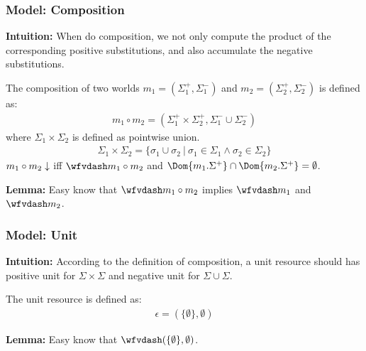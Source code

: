 \begin{frame}[fragile]
    \frametitle{Model: Composition}

\textbf{Intuition:} When do composition, we not only compute the product of the corresponding positive substitutions, and also accumulate the negative substitutions.

\begin{definition}[Composition]
    The composition of two worlds $m_1 = (\Sigma_1^+, \Sigma_1^-)$ and $m_2 = (\Sigma_2^+, \Sigma_2^-)$ is defined as:
    \begin{align*}
    m_1 \circ m_2 = (\Sigma_1^+ \times \Sigma_2^+, \Sigma_1^- \cup \Sigma_2^-)
    \end{align*}\noindent
    where $\Sigma_1 \times \Sigma_2$ is defined as pointwise union.
    \begin{align*}
    \Sigma_1 \times \Sigma_2 = \{ \sigma_1 \cup \sigma_2 ~|~ \sigma_1 \in \Sigma_1 \land \sigma_2 \in \Sigma_2 \}
    \end{align*}\noindent
    $m_1 \circ m_2 \downarrow$ iff $\wfvdash m_1 \circ m_2$ and $\Dom{m_1.\Sigma^+} \cap \Dom{m_2.\Sigma^+} = \emptyset$.
\end{definition}

\textbf{Lemma:} Easy know that $\wfvdash m_1 \circ m_2$ implies $\wfvdash m_1$ and $\wfvdash m_2$.

\end{frame}

\begin{frame}[fragile]
    \frametitle{Model: Unit}

\textbf{Intuition:} According to the definition of composition, a unit resource should has positive unit for $\Sigma \times \Sigma$ and negative unit for $\Sigma \cup \Sigma$.

\begin{definition}[Unit]
    The unit resource is defined as:
    \begin{align*}
    \epsilon = (\{\emptyset\}, \emptyset)
    \end{align*}\noindent
\end{definition}

\textbf{Lemma:} Easy know that $\wfvdash  (\{\emptyset\}, \emptyset)$.

\end{frame}

